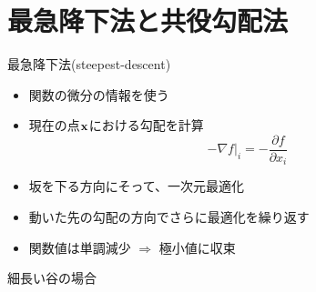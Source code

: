 \section{最急降下法と共役勾配法}

\begin{frame}[t,fragile]{最急降下法(steepest-descent)}
  \begin{itemize}
  \item 関数の微分の情報を使う
  \item 現在の点$\bf x$における勾配を計算
    \[
    -\nabla f|_i = -\frac{\partial f}{\partial x_i}
    \]
  \item 坂を下る方向にそって、一次元最適化
  \item 動いた先の勾配の方向でさらに最適化を繰り返す
  \item 関数値は単調減少 $\Rightarrow$ 極小値に収束
  \end{itemize}
\end{frame}

\begin{frame}[t,fragile]{細長い谷の場合}
  \vspace*{1em}
  \hspace*{1em}

  \vspace*{-2em}
  \hspace*{20em}{\footnotesize(Press et al 1988)}
\end{frame}


